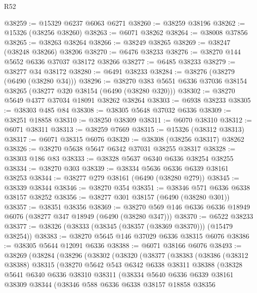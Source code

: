 \begin{lexlean}{R52}
\begin{coremodule}
@38259 := @15329 @6237 @6063 @6271
@38260 := @38259 @38196
@38262 := @15326 (@38256 @38260)
@38263 := @6071 @38262
@38264 := @38008 @37856
@38265 := @38263 @38264
@38266 := @38249 @38265
@38269 := @38247 (@38248 @38266) @38206
@38270 := @6476 @38233
@38276 := @38270 @144 @5652 @6336 @37037 @38172 @38266
@38277 := @6485 @38233
@38279 := @38277 @34 @38172
@38280 := @6491 @38233
@38284 := @38276 (@38279 (@6490 (@38280 @34)))
@38296 := @38270 @383 @5651 @6336 @37036 @38154 @38265 (@38277 @320 @38154 (@6490 (@38280 @320)))
@38302 := @38270 @5649 @4377 @37034 @18091 @38262 @38264
@38303 := @6938 @38233
@38305 := @38303 @485 @84
@38308 := @38305 @5648 @37032 @6336
@38309 := @38251 @18858
@38310 := @38250 @38309
@38311 := @6070 @38310
@38312 := @6071 @38311
@38313 := @38259 @7669
@38315 := @15326 (@38312 @38313)
@38317 := @6071 @38315 @6076
@38320 := @38308 (@38256 @38317) @38262
@38326 := @38270 @5638 @5647 @6342 @37031 @38255 @38317
@38328 := @38303 @186 @83
@38333 := @38328 @5637 @6340 @6336 @38254 @38255
@38334 := @38270 @303
@38339 := @38334 @5636 @6336 @6339 @38161 @38253
@38344 := @38277 @279 @38161 (@6490 (@38280 @279))
@38345 := @38339 @38344
@38346 := @38270 @354
@38351 := @38346 @571 @6336 @6338 @38157 @38252
@38356 := @38277 @301 @38157 (@6490 (@38280 @301))
@38357 := @38351 @38356
@38369 := @38270 @569 @146 @6336 @6336 @18949 @6076 (@38277 @347 @18949 (@6490 (@38280 @347)))
@38370 := @6522 @38233
@38377 := @38326 (@38333 (@38345 (@38357 (@38369 @38370))) (@15479 @38254))
@38383 := @38270 @5645 @146 @37029 @6336 @38315 @6076
@38386 := @38305 @5644 @12091 @6336
@38388 := @6071 @38166 @6076
@38493 := @38269
    (@38284
      (@38296
        (@38302
          (@38320
            (@38377
              (@38383
                (@38386
                  (@38312 @38388)
                  @38315
                  (@38270
                    @5642
                    @543
                    @6342
                    @6338
                    @38311
                    @38388
                    (@38328
                      @5641
                      @6340
                      @6336
                      @38310
                      @38311
                      (@38334
                        @5640
                        @6336
                        @6339
                        @38161
                        @38309
                        @38344
                        (@38346
                          @588
                          @6336
                          @6338
                          @38157
                          @18858
                          @38356

\end{coremodule}
\end{lexlean}
